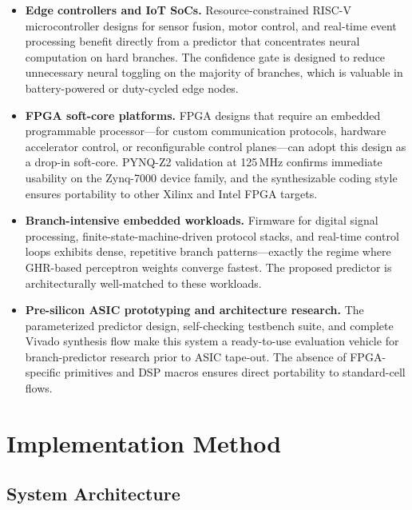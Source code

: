\documentclass[12pt,a4paper]{article}
\begin{document}
\begin{itemize}
  \item \textbf{Edge controllers and IoT SoCs.}
    Resource-constrained RISC-V microcontroller designs for sensor fusion,
    motor control, and real-time event processing benefit directly from a
    predictor that concentrates neural computation on hard branches. The
    confidence gate is designed to reduce unnecessary neural toggling on the
    majority of branches, which is valuable in battery-powered or duty-cycled
    edge nodes.

  \item \textbf{FPGA soft-core platforms.}
    FPGA designs that require an embedded programmable processor---for custom
    communication protocols, hardware accelerator control, or reconfigurable
    control planes---can adopt this design as a drop-in soft-core. PYNQ-Z2
    validation at 125\,MHz confirms immediate usability on the Zynq-7000
    device family, and the synthesizable coding style ensures portability to
    other Xilinx and Intel FPGA targets.

  \item \textbf{Branch-intensive embedded workloads.}
    Firmware for digital signal processing, finite-state-machine-driven protocol
    stacks, and real-time control loops exhibits dense, repetitive branch
    patterns---exactly the regime where GHR-based perceptron weights converge
    fastest. The proposed predictor is architecturally well-matched to these
    workloads.

  \item \textbf{Pre-silicon ASIC prototyping and architecture research.}
    The parameterized predictor design, self-checking testbench suite, and
    complete Vivado synthesis flow make this system a ready-to-use evaluation
    vehicle for branch-predictor research prior to ASIC tape-out. The absence
    of FPGA-specific primitives and DSP macros ensures direct portability to
    standard-cell flows.
\end{itemize}

\section{Implementation Method}
\label{sec:method}

\subsection{System Architecture}
\label{sec:architecture}
\end{document}
